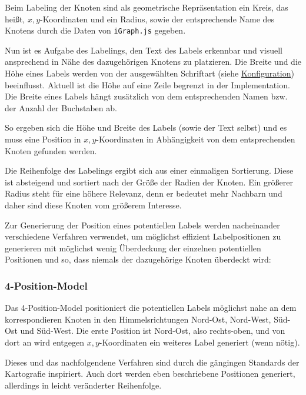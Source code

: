 

Beim Labeling der Knoten sind als geometrische Repräsentation ein Kreis, das heißt, $x,y$-Koordinaten
und ein Radius, sowie der entsprechende Name des Knotens durch die Daten von \texttt{iGraph.js} gegeben.

Nun ist es Aufgabe des Labelings, den Text des Labels erkennbar und visuell ansprechend in Nähe des dazugehörigen Knotens zu platzieren.
Die Breite und die Höhe eines Labels werden von der ausgewählten Schriftart (siehe \hyperref[sec:configuration]{Konfiguration}) beeinflusst.
Aktuell ist die Höhe auf eine Zeile begrenzt in der Implementation.
Die Breite eines Labels hängt zusätzlich von dem entsprechenden Namen bzw. der Anzahl der Buchstaben ab.

So ergeben sich die Höhe und Breite des Labels (sowie der Text selbst) und es muss eine Position in $x,y$-Koordinaten in Abhängigkeit
von dem entsprechenden Knoten gefunden werden.

Die Reihenfolge des Labelings ergibt sich aus einer einmaligen Sortierung.
Diese ist absteigend und sortiert nach der Größe der Radien der Knoten.
Ein größerer Radius steht für eine höhere Relevanz, denn er bedeutet mehr Nachbarn und daher sind diese Knoten vom größerem Interesse.

Zur Generierung der Position eines potentiellen Labels werden nacheinander verschiedene Verfahren verwendet, um möglichst effizient Labelpositionen zu generieren
mit möglichst wenig Überdeckung der einzelnen potentiellen Positionen und so, dass niemals der dazugehörige Knoten überdeckt wird:

\subsubsection{4-Position-Model}
\label{subsubsec:4pos}
Das 4-Position-Model positioniert die potentiellen Labels möglichst nahe an dem korrespondieren Knoten in den Himmelsrichtungen Nord-Ost, Nord-West, Süd-Ost und Süd-West.
Die erste Position ist Nord-Ost, also rechts-oben, und von dort an wird entgegen $x,y$-Koordinaten ein weiteres Label generiert (wenn nötig).

Dieses und das nachfolgendene Verfahren sind durch die gängingen Standards der Kartografie inspiriert. Auch dort werden eben beschriebene
Positionen generiert, allerdings in leicht veränderter Reihenfolge.\cite{cartography}

